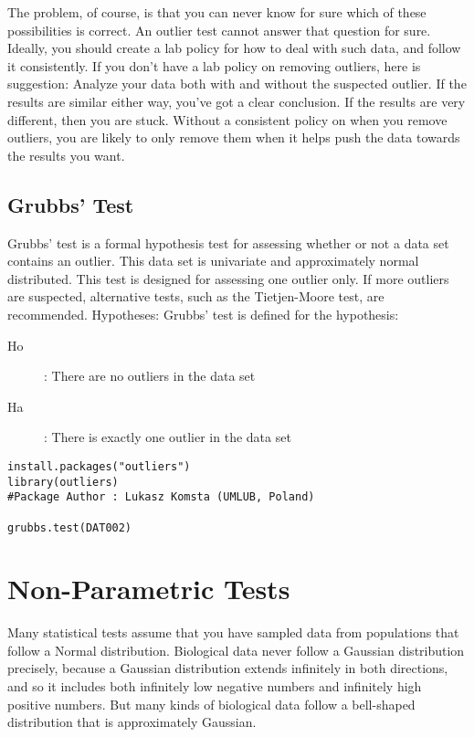 \documentclass[a4paper,12pt]{article}
\begin{document}
The problem, of course, is that you can never know for sure which of these possibilities is correct. An outlier test cannot answer that question for sure. Ideally, you should create a lab policy for how to deal with such data, and follow it consistently.
If you don't have a lab policy on removing outliers, here is suggestion: Analyze your data both with and without the suspected outlier. If the results are similar either way, you've got a clear conclusion. If the results are very different, then you are stuck. Without a consistent policy on when you remove outliers, you are likely to only remove them when it helps push the data towards the results you want.


\subsection{Grubbs’ Test}
Grubbs' test is a formal hypothesis test for assessing whether or not a  data set contains an outlier.
This data set is univariate and approximately normal distributed. This test is designed for assessing one outlier only.  If more outliers are suspected, alternative tests, such as the Tietjen-Moore test, are recommended.
Hypotheses: Grubbs' test is defined for the hypothesis: 
\begin{description}
\item[Ho] :  There are no outliers in the data set  
\item[Ha] :  There is exactly one outlier in the data set  
\end{description}

\begin{framed}
\begin{verbatim}
install.packages("outliers")
library(outliers)
#Package Author : Lukasz Komsta (UMLUB, Poland)

grubbs.test(DAT002)
\end{verbatim}
\end{framed}



\section{Non-Parametric Tests}
Many statistical tests assume that you have sampled data from populations that follow a Normal distribution. 
Biological data never follow a Gaussian distribution precisely, because a Gaussian distribution extends infinitely in both directions, and so it includes both infinitely low negative numbers and infinitely high positive numbers. But many kinds of biological data follow a bell-shaped distribution that is approximately Gaussian. 
\end{document}
